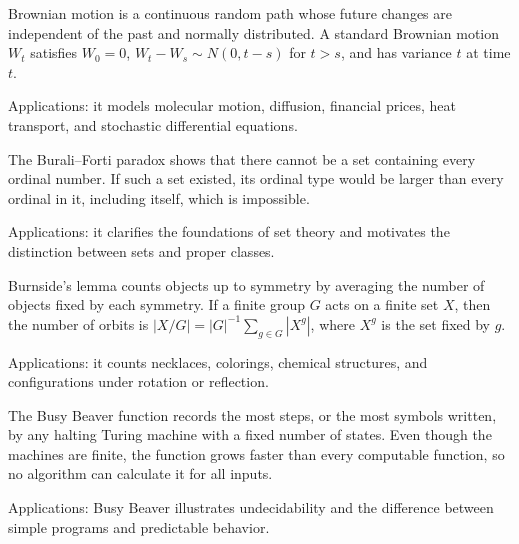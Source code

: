 Brownian motion is a continuous random path whose future changes are independent of the past and normally distributed. A standard Brownian motion $W_t$ satisfies $W_0=0$, $W_t-W_s\sim N(0,t-s)$ for $t>s$, and has variance $t$ at time $t$. \par\noindent Applications: it models molecular motion, diffusion, financial prices, heat transport, and stochastic differential equations.

The Burali--Forti paradox shows that there cannot be a set containing every ordinal number. If such a set existed, its ordinal type would be larger than every ordinal in it, including itself, which is impossible. \par\noindent Applications: it clarifies the foundations of set theory and motivates the distinction between sets and proper classes.

Burnside's lemma counts objects up to symmetry by averaging the number of objects fixed by each symmetry. If a finite group $G$ acts on a finite set $X$, then the number of orbits is $|X/G|=|G|^{-1}\sum_{g\in G}|X^g|$, where $X^g$ is the set fixed by $g$. \par\noindent Applications: it counts necklaces, colorings, chemical structures, and configurations under rotation or reflection.

The Busy Beaver function records the most steps, or the most symbols written, by any halting Turing machine with a fixed number of states. Even though the machines are finite, the function grows faster than every computable function, so no algorithm can calculate it for all inputs. \par\noindent Applications: Busy Beaver illustrates undecidability and the difference between simple programs and predictable behavior.
